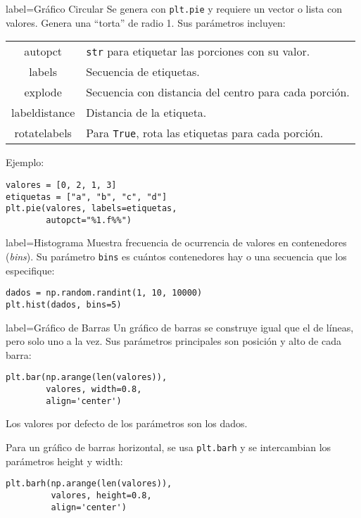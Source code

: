 \begin{contentbox}{label=Gráfico Circular}
    Se genera con \lstinline!plt.pie! y requiere un vector o lista con valores. Genera una ``torta'' de radio 1. Sus parámetros incluyen:

    \begin{tabular}{C|p{0.5\textwidth}}
        autopct & \lstinline!str! para etiquetar las porciones con su valor. \\
        labels & Secuencia de etiquetas. \\
        explode & Secuencia con distancia del centro para cada porción. \\
        labeldistance & Distancia de la etiqueta. \\
        rotatelabels & Para \lstinline!True!, rota las etiquetas para cada porción.
    \end{tabular}
    
    Ejemplo:
\begin{lstlisting}
valores = [0, 2, 1, 3]
etiquetas = ["a", "b", "c", "d"]
plt.pie(valores, labels=etiquetas,
        autopct="%1.f%%")
\end{lstlisting}
\end{contentbox}

\begin{contentbox}{label=Histograma}
    Muestra frecuencia de ocurrencia de valores en contenedores (\textit{bins}). Su parámetro \lstinline!bins! es cuántos contenedores hay o una secuencia que los especifique:
    
\begin{lstlisting}
dados = np.random.randint(1, 10, 10000)
plt.hist(dados, bins=5)
\end{lstlisting}

\end{contentbox}

\begin{contentbox}{label=Gráfico de Barras}
    Un gráfico de barras se construye igual que el de líneas, pero solo uno a la vez. Sus parámetros principales son posición y alto de cada barra:
\begin{lstlisting}
plt.bar(np.arange(len(valores)),
        valores, width=0.8,
        align='center')
\end{lstlisting}

    Los valores por defecto de los parámetros son los dados.
    
    Para un gráfico de barras horizontal, se usa \lstinline!plt.barh! y se intercambian los parámetros height y width:
\begin{lstlisting}
plt.barh(np.arange(len(valores)),
         valores, height=0.8,
         align='center')
\end{lstlisting}
\end{contentbox}

